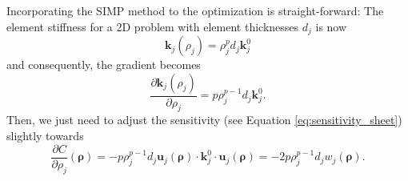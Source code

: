 Incorporating the SIMP method to the optimization is straight-forward: The element stiffness for a 2D problem with element thicknesses $d_j$ is now 
\begin{equation}
    \mathbf{k}_j(\rho_j) =  \rho_j^p d_j \mathbf{k}^0_j
\end{equation}
and consequently, the gradient becomes 
\begin{equation}
    \frac{\partial\mathbf{k}_j(\rho_j)}{\partial \rho_j} =  p \rho_j^{p-1}  d_j\mathbf{k}^0_j.
\end{equation}
Then, we just need to adjust the sensitivity (see Equation \ref{eq:sensitivity_sheet}) slightly towards
\begin{equation}
    \frac{\partial C}{\partial \rho_j} (\pmb{\rho}) = - p \rho_j^{p-1} d_j\mathbf{u}_j(\pmb{\rho})  \cdot \mathbf{k}^0_j \cdot \mathbf{u}_j(\pmb{\rho}) = -2 p \rho_j^{p-1} d_j w_j(\pmb{\rho}).
    \label{eq:sensitivity_topology}
\end{equation}

